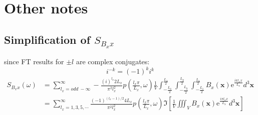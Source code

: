 \documentclass[11pt,english]{article}
\begin{document}
\begin{comment}
\section{Mirrored cell -- generic window}
\begin{equation}
	f^m(x) \equiv
	\begin{cases}
		f(x-w+1/2),		& x \leq w		\\
		f(w+1/2-x)		& x > w
	\end{cases}
\end{equation}
\begin{align}
	\tilde{f}^m(k) & \equiv \int_{w-1}^{w+1} f^m(x) e^{-\pi i k x} dx
	= e^{-w k \pi i} \int_{-1}^{1} f^m \left( x + w \right) e^{-\pi i k x} dx \\
	& = e^{-w k \pi i} \int_{-1}^{0} f^m \left( x + w \right)
	\left(e^{-\pi i k x}+e^{\pi i k x}\right) dx \\
	& = e^{-w k \pi i}
	\Bigg[
		e^{\frac{k}{2} \pi i} \underbrace{\int_{-1/2}^{1/2} f(x) e^{-\pi i k x} dx}_{\tilde f \left( \frac{k}{2} \right)}
		+e^{-\frac{k}{2} \pi i} \underbrace{\int_{-1/2}^{1/2} f(x) e^{\pi i k x} dx}_{\tilde f \left( -\frac{k}{2} \right)}
	\Bigg]
\end{align}
\end{comment}

\section{Other notes}

\subsection{Simplification of $S_{B_x x}$}

since FT results for $\pm l$ are complex conjugates:
\begin{equation}
	i^{-k} = (-1)^k i^k
\end{equation}
\begin{align}
S_{B_x x}(\omega) & = \sum_{l_x=odd~-\infty }^{\infty } -\frac{(i)^{l_x}2L_x}{\pi ^{2}l_x^{2}}
	p\left(\frac{l_x \pi}{L_x}, \omega \right)
	\frac{1}{V} \int_{-\frac{L_x}{2}}^{\frac{L_x}{2}}\int_{-\frac{L_y}{2}}^{\frac{L_y}{2}} \int_{-\frac{L_z}{2}}^{\frac{L_z}{2}}
	B_x(\mathbf{x} )\mathrm{e}^{\frac{i\pi l_x x}{L_x}}d^3\mathbf{x} \\
		& = \sum_{l_x = 1,3,5,\cdots}^{\infty} \frac{(-1)^{(l_x-1)/2} 4 L_x}{\pi ^{2}l_x^{2}}
	p\left(\frac{l_x \pi}{L_x}, \omega \right)
	\Im \left[ \frac{1}{V} \iiint_V
	B_x(\mathbf{x} )\mathrm{e}^{\frac{i\pi l_x x}{L_x}}d^3\mathbf{x} \right]
\end{align}
\end{document}
